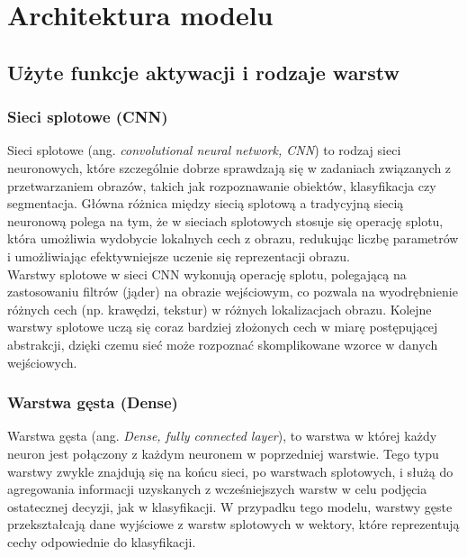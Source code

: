 \section{Architektura modelu}\label{sec:architektura-modelu}

\subsection{Użyte funkcje aktywacji i rodzaje warstw}\label{subsec:uzyte-funkcje-aktywacji-i-rodzaje-warstw}

\subsubsection{Sieci splotowe (CNN)}
Sieci splotowe (ang. \textit{convolutional neural network, CNN}) to rodzaj sieci neuronowych, które szczególnie dobrze sprawdzają się w zadaniach związanych
z przetwarzaniem obrazów, takich jak rozpoznawanie obiektów, klasyfikacja czy segmentacja.
Główna różnica między siecią splotową a tradycyjną siecią neuronową polega na tym,
że w sieciach splotowych stosuje się operację splotu, która umożliwia wydobycie lokalnych cech z obrazu,
redukując liczbę parametrów i umożliwiając efektywniejsze uczenie się reprezentacji obrazu. \\
Warstwy splotowe w sieci CNN wykonują operację splotu, polegającą na zastosowaniu filtrów (jąder) na obrazie wejściowym,
co pozwala na wyodrębnienie różnych cech (np. krawędzi, tekstur) w różnych lokalizacjach obrazu.
Kolejne warstwy splotowe uczą się coraz bardziej złożonych cech w miarę postępującej abstrakcji,
dzięki czemu sieć może rozpoznać skomplikowane wzorce w danych wejściowych.

\subsubsection{Warstwa gęsta (Dense)}
Warstwa gęsta (ang. \textit{Dense, fully connected layer}), to warstwa w której każdy neuron jest połączony z każdym neuronem w poprzedniej warstwie.
Tego typu warstwy zwykle znajdują się na końcu sieci, po warstwach splotowych, i służą do agregowania informacji uzyskanych
z wcześniejszych warstw w celu podjęcia ostatecznej decyzji, jak w klasyfikacji.
W przypadku tego modelu, warstwy gęste przekształcają dane wyjściowe z warstw splotowych w wektory,
które reprezentują cechy odpowiednie do klasyfikacji.


